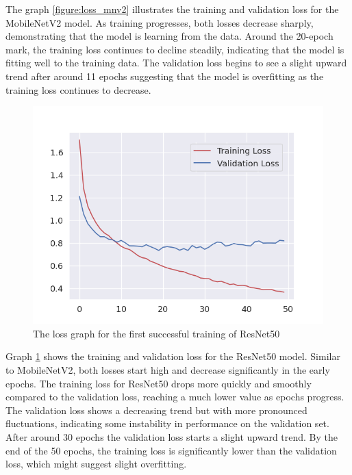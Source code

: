 The graph \ref{figure:loss_mnv2} illustrates the training and validation loss for the MobileNetV2 model. As training progresses, both losses decrease sharply, demonstrating that the model is learning from the data. Around the 20-epoch mark, the training loss continues to decline steadily, indicating that the model is fitting well to the training data. The validation loss begins to see a slight upward trend after around 11 epochs suggesting that the model is overfitting as the training loss continues to decrease.

\begin{figure}[H]
    \centering{}
    \includegraphics[scale=0.5]{fed_images/train_loss_ResNet50.png}
    \caption{The loss graph for the first successful training of ResNet50}
    \label{figure:loss_rn50}
\end{figure}

Graph \ref{figure:loss_rn50} shows the training and validation loss for the ResNet50 model. Similar to MobileNetV2, both losses start high and decrease significantly in the early epochs. The training loss for ResNet50 drops more quickly and smoothly compared to the validation loss, reaching a much lower value as epochs progress. The validation loss shows a decreasing trend but with more pronounced fluctuations, indicating some instability in performance on the validation set. After around 30 epochs the validation loss starts a slight upward trend. By the end of the 50 epochs, the training loss is significantly lower than the validation loss, which might suggest slight overfitting.

